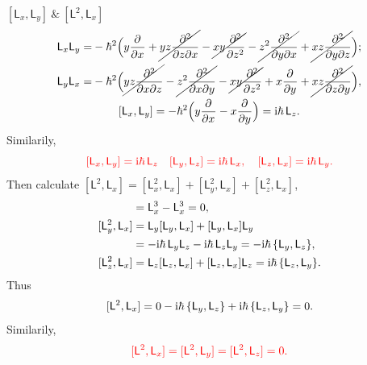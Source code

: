 \documentclass{article}
\newcommand*{\op}[1]{\mathsf{#1}}
\newcommand{\su}[1]{\vspace{-#1 pt}}
\newcommand{\spark}[1]{\textcolor{red}{#1}}
\begin{document}
\begin{example}{$[\op{L}_x,\op{L}_y]~\&~[\op{L}^2,\op{L}_x]$}{}\su{10}
	\begin{gather*}
		\begin{aligned}
			\op{L}_x\op{L}_y= & -\hbar^2\Bigp{y\pp x+\cancel{yz\pw{}zx}-\cancel{xy\pp[2]z}-\cancel{z^2\pw{}yx}+\cancel{xz\pw{}yz}}; \\
			\op{L}_y\op{L}_x= & -\hbar^2\Bigp{\cancel{yz\pw{}xz}-\cancel{z^2\pw{}xy}-\cancel{xy\pp[2]z}+x\pp y+\cancel{xz\pw{}zy}}, %
		\end{aligned}\\
		[\op{L}_x,\op{L}_y]=-\hbar^2\Bigp{y\pp x-x\pp y}=\i\hbar\,\op{L}_z.
	\end{gather*}
	Similarily,
	$$\spark{[\op{L}_x,\op{L}_y]=\i\hbar\,\op{L}_z\quad[\op{L}_y,\op{L}_z]=\i\hbar\,\op{L}_x,\quad[\op{L}_z,\op{L}_x]=\i\hbar\,\op{L}_y.}$$
	Then calculate $[\op{L}^2,\op{L}_x]=[\op{L}_x^2,\op{L}_x]+[\op{L}^2_y,\op{L}_x]+[\op{L}^2_z,\op{L}_x]$,
	\begin{align*}
		[\op{L}_x^2,\op{L}_x] & =\op{L}_x^3-\op{L}_x^3=0,                                                     \\
		[\op{L}^2_y,\op{L}_x] & =\op{L}_y[\op{L}_y,\op{L}_x]+[\op{L}_y,\op{L}_x]\op{L}_y                          \\
		                    & =-\i\hbar\,\op{L}_y\op{L}_z-\i\hbar\,\op{L}_z\op{L}_y=-\i\hbar\,\{\op{L}_y,\op{L}_z\},       \\
		[\op{L}^2_z,\op{L}_x] & =\op{L}_z[\op{L}_z,\op{L}_x]+[\op{L}_z,\op{L}_x]\op{L}_z=\i\hbar\,\{\op{L}_z,\op{L}_y\}.
	\end{align*}
	Thus
	$$[\op{L}^2,\op{L}_x]=0-\i\hbar\,\{\op{L}_y,\op{L}_z\}+\i\hbar\,\{\op{L}_z,\op{L}_y\}=0.$$
	Similarily,
	$$\spark{[\op{L}^2,\op{L}_x]=[\op{L}^2,\op{L}_y]=[\op{L}^2,\op{L}_z]=0.}$$
\end{example}
\end{document}

